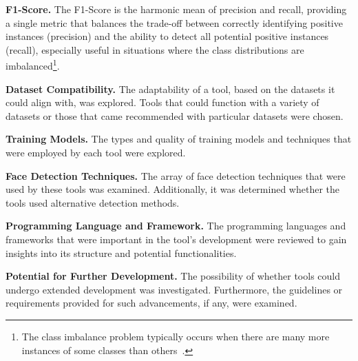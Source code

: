 \textbf{F1-Score.} The F1-Score is the harmonic mean of precision and recall, providing
a single metric that balances the trade-off between correctly identifying positive
instances (precision) and the ability to detect all potential positive instances (recall),
especially useful in situations where the class distributions are imbalanced\footnote{The class
	imbalance problem typically occurs when there are many more instances of some
	classes than others~\cite{JAVAHERI2014153}.}.

\textbf{Dataset Compatibility.} The adaptability of a tool, based on the datasets it
could align with, was explored. Tools that could function with a variety of datasets
or those that came recommended with particular datasets were chosen.

\textbf{Training Models.} The types and quality of training models and techniques that
were employed by each tool were explored.

\textbf{Face Detection Techniques.} The array of face detection techniques that were
used by these tools was examined. Additionally, it was determined whether the tools
used alternative detection methods.

\textbf{Programming Language and Framework.} The programming languages and frameworks
that were important in the tool's development were reviewed to gain insights into its
structure and potential functionalities.

\textbf{Potential for Further Development.} The possibility of whether tools could
undergo extended development was investigated. Furthermore, the guidelines or
requirements provided for such advancements, if any, were examined.


